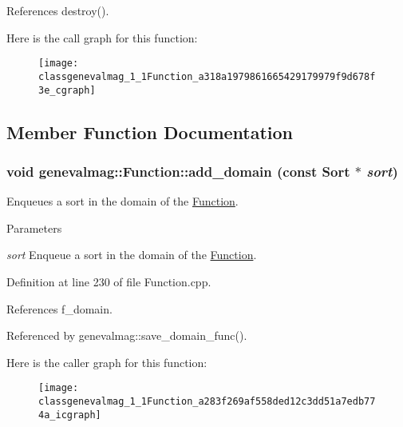 References destroy().



Here is the call graph for this function:\nopagebreak
\begin{figure}[H]
\begin{center}
\leavevmode
\texttt{[image: classgenevalmag\_1\_1Function\_a318a1979861665429179979f9d678f3e\_cgraph]}
\end{center}
\end{figure}




\subsection{Member Function Documentation}
\hypertarget{classgenevalmag_1_1Function_a283f269af558ded12c3dd51a7edb774a}{
\subsubsection[{add\_\-domain}]{\setlength{\rightskip}{0pt plus 5cm}void genevalmag::Function::add\_\-domain (const {\bf Sort} $\ast$ {\em sort})}}
\label{classgenevalmag_1_1Function_a283f269af558ded12c3dd51a7edb774a}
Enqueues a sort in the domain of the \hyperlink{classgenevalmag_1_1Function}{Function}. 
\begin{DoxyParams}{Parameters}
\item[{\em sort}]Enqueue a sort in the domain of the \hyperlink{classgenevalmag_1_1Function}{Function}. \end{DoxyParams}


Definition at line 230 of file Function.cpp.



References f\_\-domain.



Referenced by genevalmag::save\_\-domain\_\-func().



Here is the caller graph for this function:\nopagebreak
\begin{figure}[H]
\begin{center}
\leavevmode
\texttt{[image: classgenevalmag\_1\_1Function\_a283f269af558ded12c3dd51a7edb774a\_icgraph]}
\end{center}
\end{figure}


